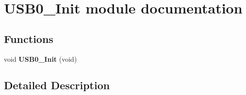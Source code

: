 \hypertarget{group___u_s_b0___init__module}{}\section{U\+S\+B0\+\_\+\+Init module documentation}
\label{group___u_s_b0___init__module}
\subsection*{Functions}
\begin{DoxyCompactItemize}
\item 
void {\bfseries U\+S\+B0\+\_\+\+Init} (void)\hypertarget{group___u_s_b0___init__module_ga2a95aaf1529d07d27a906b56f587e5ad}{}\label{group___u_s_b0___init__module_ga2a95aaf1529d07d27a906b56f587e5ad}

\end{DoxyCompactItemize}


\subsection{Detailed Description}
